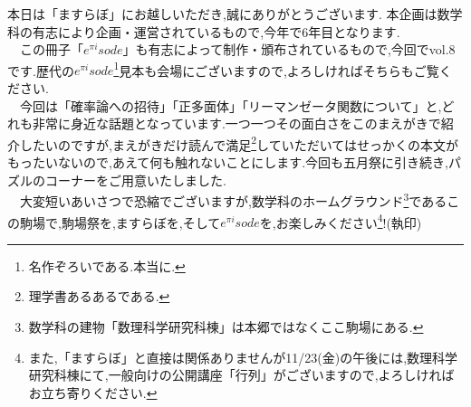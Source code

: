 
本日は「ますらぼ」にお越しいただき,誠にありがとうございます.
本企画は数学科の有志により企画・運営されているもので,今年で6年目となります.\\
　この冊子「$e^{\pi i}sode$」も有志によって制作・頒布されているもので,今回でvol.8です.歴代の$e^{\pi i}sode$\footnote{名作ぞろいである.本当に.}見本も会場にございますので,よろしければそちらもご覧ください.\\
　今回は「確率論への招待」「正多面体」「リーマンゼータ関数について」と,どれも非常に身近な話題となっています.一つ一つその面白さをこのまえがきで紹介したいのですが,まえがきだけ読んで満足\footnote{理学書あるあるである.}していただいてはせっかくの本文がもったいないので,あえて何も触れないことにします.今回も五月祭に引き続き,パズルのコーナーをご用意いたしました.\\
　大変短いあいさつで恐縮でございますが,数学科のホームグラウンド\footnote{数学科の建物「数理科学研究科棟」は本郷ではなくここ駒場にある.}であるこの駒場で,駒場祭を,ますらぼを,そして$e^{\pi i}sode$を,お楽しみください\footnote{また,「ますらぼ」と直接は関係ありませんが11/23(金)の午後には,数理科学研究科棟にて,一般向けの公開講座「行列」がございますので,よろしければお立ち寄りください.}!(執印)
